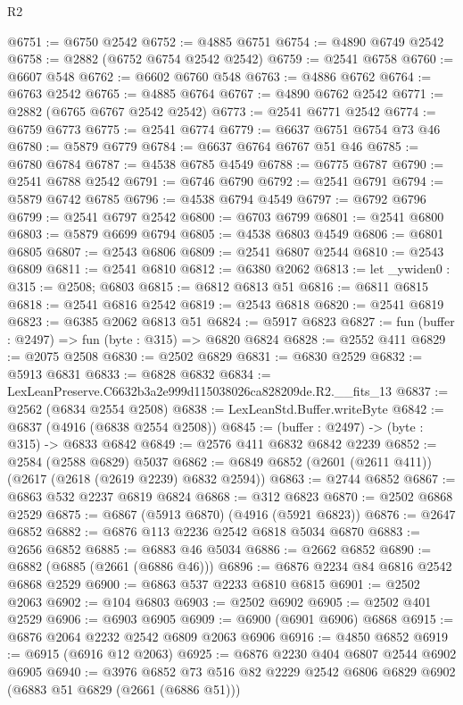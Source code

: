 \begin{lexlean}{R2}
\begin{coremodule}
@6751 := @6750 @2542
@6752 := @4885 @6751
@6754 := @4890 @6749 @2542
@6758 := @2882 (@6752 @6754 @2542 @2542)
@6759 := @2541 @6758
@6760 := @6607 @548
@6762 := @6602 @6760 @548
@6763 := @4886 @6762
@6764 := @6763 @2542
@6765 := @4885 @6764
@6767 := @4890 @6762 @2542
@6771 := @2882 (@6765 @6767 @2542 @2542)
@6773 := @2541 @6771 @2542
@6774 := @6759 @6773
@6775 := @2541 @6774
@6779 := @6637 @6751 @6754 @73 @46
@6780 := @5879 @6779
@6784 := @6637 @6764 @6767 @51 @46
@6785 := @6780 @6784
@6787 := @4538 @6785 @4549
@6788 := @6775 @6787
@6790 := @2541 @6788 @2542
@6791 := @6746 @6790
@6792 := @2541 @6791
@6794 := @5879 @6742 @6785
@6796 := @4538 @6794 @4549
@6797 := @6792 @6796
@6799 := @2541 @6797 @2542
@6800 := @6703 @6799
@6801 := @2541 @6800
@6803 := @5879 @6699 @6794
@6805 := @4538 @6803 @4549
@6806 := @6801 @6805
@6807 := @2543 @6806
@6809 := @2541 @6807 @2544
@6810 := @2543 @6809
@6811 := @2541 @6810
@6812 := @6380 @2062
@6813 := let _ywiden0 : @315 := @2508; @6803
@6815 := @6812 @6813 @51
@6816 := @6811 @6815
@6818 := @2541 @6816 @2542
@6819 := @2543 @6818
@6820 := @2541 @6819
@6823 := @6385 @2062 @6813 @51
@6824 := @5917 @6823
@6827 := fun (buffer : @2497) => fun (byte : @315) => @6820 @6824
@6828 := @2552 @411
@6829 := @2075 @2508
@6830 := @2502 @6829
@6831 := @6830 @2529
@6832 := @5913 @6831
@6833 := @6828 @6832
@6834 := LexLeanPreserve.C6632b3a2e999d115038026ca828209de.R2.__fits_13
@6837 := @2562 (@6834 @2554 @2508)
@6838 := LexLeanStd.Buffer.writeByte
@6842 := @6837 (@4916 (@6838 @2554 @2508))
@6845 := (buffer : @2497) -> (byte : @315) -> @6833 @6842
@6849 := @2576 @411 @6832 @6842 @2239
@6852 := @2584 (@2588 @6829) @5037
@6862 := @6849 @6852 (@2601 (@2611 @411)) (@2617 (@2618 (@2619 @2239) @6832 @2594))
@6863 := @2744 @6852
@6867 := @6863 @532 @2237 @6819 @6824
@6868 := @312 @6823
@6870 := @2502 @6868 @2529
@6875 := @6867 (@5913 @6870) (@4916 (@5921 @6823))
@6876 := @2647 @6852
@6882 := @6876 @113 @2236 @2542 @6818 @5034 @6870
@6883 := @2656 @6852
@6885 := @6883 @46 @5034
@6886 := @2662 @6852
@6890 := @6882 (@6885 (@2661 (@6886 @46)))
@6896 := @6876 @2234 @84 @6816 @2542 @6868 @2529
@6900 := @6863 @537 @2233 @6810 @6815
@6901 := @2502 @2063
@6902 := @104 @6803
@6903 := @2502 @6902
@6905 := @2502 @401 @2529
@6906 := @6903 @6905
@6909 := @6900 (@6901 @6906) @6868
@6915 := @6876 @2064 @2232 @2542 @6809 @2063 @6906
@6916 := @4850 @6852
@6919 := @6915 (@6916 @12 @2063)
@6925 := @6876 @2230 @404 @6807 @2544 @6902 @6905
@6940 := @3976
    @6852
    @73
    @516
    @82
    @2229
    @2542
    @6806
    @6829
    @6902
    (@6883 @51 @6829 (@2661 (@6886 @51)))

\end{coremodule}
\end{lexlean}
